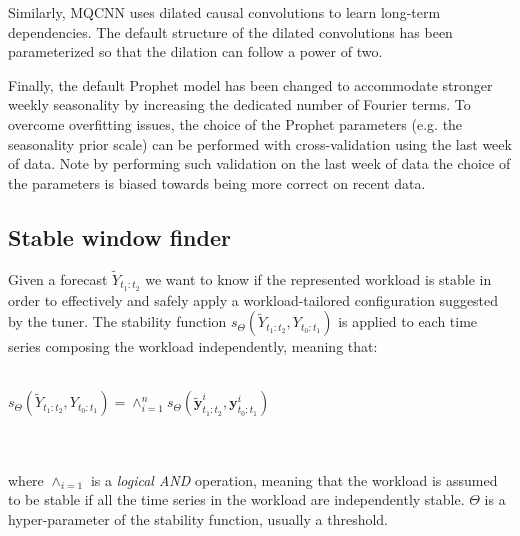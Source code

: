 \documentclass[a4paper, 12pt]{article} %
\begin{document}
	Similarly, MQCNN uses dilated causal convolutions to learn long-term dependencies. The default structure of the dilated convolutions has been parameterized so  that the dilation can follow a power of two.
	
	Finally, the default Prophet model has been changed to accommodate stronger weekly seasonality by increasing the dedicated number of Fourier terms. To overcome overfitting issues, the choice of the Prophet parameters (e.g. the seasonality prior scale) can be performed with cross-validation using the last week of data. Note by performing such validation on the last week of data the choice of the parameters is biased towards being more correct on recent data.
	
	\subsection{Stable window finder} \label{ssec:stable_window_finder}	
	Given a forecast $\tilde{Y}_{t_1:t_2}$ we want to know if the represented workload is stable in order to effectively and safely apply a workload-tailored configuration suggested by the tuner.
	The stability function $s_\Theta(\tilde{Y}_{t_1:t_2}, Y_{t_0:t_1})$ is applied to each time series composing the workload independently, meaning that:\\\\
	\centerline{
	$
	s_\Theta(\tilde{Y}_{t_1:t_2}, Y_{t_0:t_1}) = \wedge_{i=1} ^n s_\Theta(\tilde{\pmb{y}}_{t_1:t_2}^i, \pmb{y}_{t_0:t_1}^i)
	$
	}\\\\ 
	where $ \wedge_{i=1}$ is a \textit{logical AND} operation, meaning that the workload is assumed to be stable if all the time series in the workload are independently stable. $\Theta$ is a hyper-parameter of the stability function, usually a threshold.
	
\end{document}
